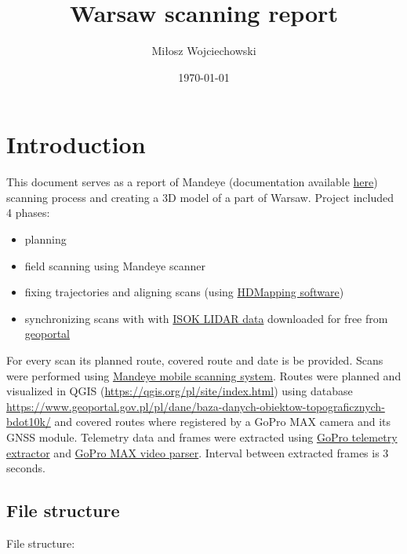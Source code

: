 \documentclass[a4paper,12pt]{book}
\title{Warsaw scanning report}
\author{Miłosz Wojciechowski}
\date{\today}
\begin{document}
\maketitle
\pagebreak
\tableofcontents
\pagebreak

\chapter{Introduction}
This document serves as a report of Mandeye (documentation available \href{https://github.com/JanuszBedkowski/mandeye_controller/tree/main/doc/manual/manual_v0_2}{here}) scanning process and creating a 3D model of a part of Warsaw. Project  included 4 phases:

\begin{itemize}
	\item planning
	\item field scanning using Mandeye scanner
	\item fixing trajectories and aligning scans (using \href{https://github.com/MapsHD/HDMapping}{HDMapping software})
	\item synchronizing scans with with \href{https://isok.gov.pl/index.html}{ISOK LIDAR data} downloaded for free from \href{URL}{geoportal}
\end{itemize}

For every scan its planned route, covered route and date is be provided. Scans were performed using \href{https://github.com/JanuszBedkowski/mandeye_controller/tree/main}{Mandeye mobile scanning system}. Routes were planned and visualized in QGIS (\url{https://qgis.org/pl/site/index.html}) using database \href{BDOT10k}{https://www.geoportal.gov.pl/pl/dane/baza-danych-obiektow-topograficznych-bdot10k/} and covered routes where registered by a GoPro MAX camera and its GNSS module. Telemetry data and frames were extracted using
\href{https://github.com/miloszwojciechowski/Warsaw-model/tree/main/GoPro-Telemetry-Extractor}{GoPro telemetry extractor} and \href{https://github.com/miloszwojciechowski/Warsaw-model/tree/main/GoPro_MAX_video_parser}{GoPro MAX video parser}. Interval between extracted frames is 3 seconds.\\

\pagebreak

\section{File structure}
File structure: 
\end{document}
